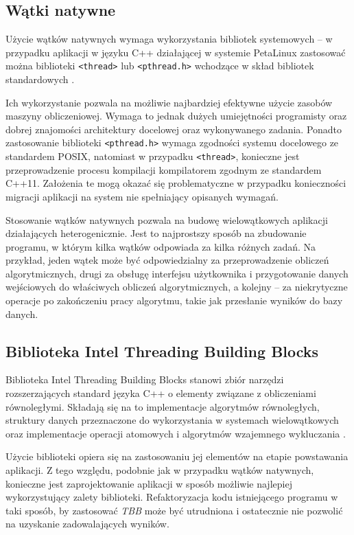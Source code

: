 \subsection{Wątki natywne}

Użycie wątków natywnych wymaga wykorzystania bibliotek systemowych -- w przypadku aplikacji w języku C++ działającej w systemie PetaLinux zastosować można biblioteki \texttt{<thread>} lub \texttt{<pthread.h>} wchodzące w skład bibliotek standardowych \cite{Williams2013}.
 
Ich wykorzystanie pozwala na możliwie najbardziej efektywne użycie zasobów maszyny obliczeniowej. 
Wymaga to jednak dużych umiejętności programisty oraz dobrej znajomości architektury docelowej oraz wykonywanego zadania. 
Ponadto zastosowanie biblioteki \texttt{<pthread.h>} wymaga zgodności systemu docelowego ze standardem POSIX, natomiast w przypadku \texttt{<thread>}, konieczne jest przeprowadzenie procesu kompilacji kompilatorem zgodnym ze standardem C++11. 
Założenia te mogą okazać się problematyczne w przypadku konieczności migracji aplikacji na system nie spełniający opisanych wymagań.

Stosowanie wątków natywnych pozwala na budowę wielowątkowych aplikacji działających heterogenicznie. 
Jest to najprostszy sposób na zbudowanie programu, w którym kilka wątków odpowiada za kilka różnych zadań. 
Na przykład, jeden wątek może być odpowiedzialny za przeprowadzenie obliczeń algorytmicznych, drugi za obsługę interfejsu użytkownika i przygotowanie danych wejściowych do właściwych obliczeń algorytmicznych, a kolejny -- za niekrytyczne operacje po zakończeniu pracy algorytmu, takie jak przesłanie wyników do bazy danych.

\subsection{Biblioteka Intel Threading Building Blocks}

Biblioteka Intel Threading Building Blocks stanowi zbiór narzędzi rozszerzających standard języka C++ o elementy związane z obliczeniami równoległymi. 
Składają się na to implementacje algorytmów równoległych, struktury danych przeznaczone do wykorzystania w systemach wielowątkowych oraz implementacje operacji atomowych i algorytmów wzajemnego wykluczania \cite{Reinders2010}.

Użycie biblioteki opiera się na zastosowaniu jej elementów na etapie powstawania aplikacji. 
Z tego względu, podobnie jak w przypadku wątków natywnych, konieczne jest zaprojektowanie aplikacji w sposób możliwie najlepiej wykorzystujący zalety biblioteki. 
Refaktoryzacja kodu istniejącego programu w taki sposób, by zastosować \emph{TBB} może być utrudniona i ostatecznie nie pozwolić na uzyskanie zadowalających wyników.


